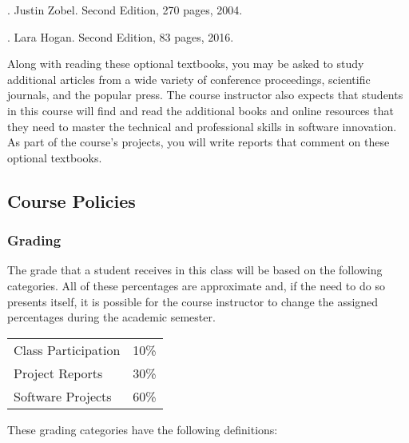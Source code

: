 \documentclass[11pt]{article}
\begin{document}
. Justin Zobel. Second Edition, 270
pages, 2004.
%
\vspace*{.25em}

. Lara Hogan. Second Edition, 83
pages, 2016.
%
\vspace*{1em}

\noindent Along with reading these optional textbooks, you may be asked to study
additional articles from a wide variety of conference proceedings, scientific
journals, and the popular press. The course instructor also expects that
students in this course will find and read the additional books and online
resources that they need to master the technical and professional skills in
software innovation. As part of the course's projects, you will write reports
that comment on these optional textbooks.

\subsection*{Course Policies}

\subsubsection*{Grading}

The grade that a student receives in this class will be based on the following
categories. All of these percentages are approximate and, if the need to do so
presents itself, it is possible for the course instructor to change the assigned
percentages during the academic semester.

\renewcommand{\arraystretch}{1.2}

\begin{center}
  \begin{tabular}{ll}
    Class Participation        & 10\%  \\
    Project Reports            & 30\% \\
    Software Projects          & 60\%
  \end{tabular}
\end{center}

\noindent
These grading categories have the following definitions:

\vspace*{-.05in}
\end{document}
